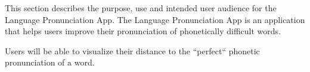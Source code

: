 This section describes the purpose, use and intended user audience for the Language Pronunciation App.
The Language Pronunciation App is an application that helps users improve their pronunciation of phonetically difficult words.


Users will be able to visualize their distance to the ``perfect`` phonetic pronunciation of a word.
